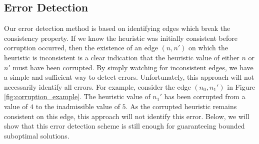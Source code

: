 \documentclass[letterpaper]{article}
\begin{document}

\subsection{Error Detection}

Our error detection method 
is based on identifying edges which break the consistency property.
If we know the heuristic was initially consistent before corruption occurred, then the existence of an edge $(n, n')$ on which the heuristic is inconsistent is a clear indication that the heuristic value of either $n$ or $n'$ must have been corrupted.
By simply watching for inconsistent edges, we have a simple and sufficient way to detect errors.
Unfortunately, this approach will not necessarily identify all errors.
For example, consider the edge $(n_0, n_1')$ in Figure \ref{fig:corruption_example}.
The heuristic value of $n_1'$ has been corrupted from a value of $4$ to the inadmissible value of $5$.
As the corrupted heuristic remains consistent on this edge, this approach will not identify this error.
Below, we will show that this error detection scheme is still enough for guaranteeing bounded suboptimal solutions. 






\end{document}
